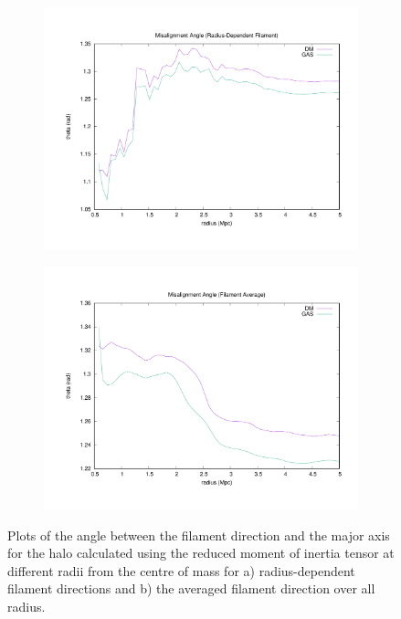 \documentclass[journal]{IEEEtran}
\begin{document}
\begin{figure}[!t]
\centering
	\begin{subfigure}[t]{0.45\textwidth}
		\centering
		\includegraphics[width=\linewidth]{MisalignmentConst.pdf}
	\end{subfigure}
	\quad
	\begin{subfigure}[t]{0.45\textwidth}
		\centering
		\includegraphics[width=\linewidth]{MisalignmentAve.pdf}
	\end{subfigure}
\label{fig:angleplots}
	\caption{Plots of the angle between the filament direction and the major axis for the halo calculated using the reduced moment of inertia tensor at different radii from the centre of mass for a) radius-dependent filament directions and b) the averaged filament direction over all radius.}
\end{figure}
\end{document}
